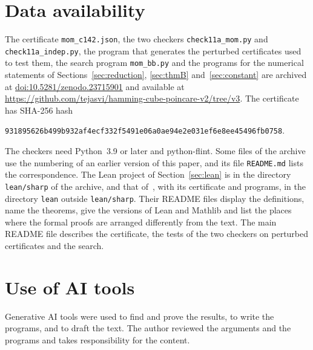 \documentclass[11pt]{amsart}
\theoremstyle{remark}
\numberwithin{equation}{section}
\newcommand{\CertSha}{931895626b499b932af4ecf332f5491e06a0ae94e2e031ef6e8ee45496fb0758}
\newcommand{\SUPPDOI}{10.5281/zenodo.23715901}
\newcommand{\REPOURL}{https://github.com/tejasvi/hamming-cube-poincare-v2/tree/v3}
\begin{document}
\section*{Data availability}
\begingroup\sloppy
The certificate \texttt{mom\_c142.json}, the two checkers \texttt{check11a\_mom.py} and \texttt{check11a\_indep.py}, the program that generates the perturbed certificates used to test them, the search program \texttt{mom\_bb.py} and the programs for the numerical statements of Sections~\ref{sec:reduction}, \ref{sec:thmB} and~\ref{sec:constant} are archived at \href{https://doi.org/\SUPPDOI}{doi:\SUPPDOI} and available at\\ \url{\REPOURL}. The certificate has SHA-256 hash
\begin{center}\scriptsize\texttt{\CertSha}.\end{center}
The checkers need Python~3.9 or later and python-flint. Some files of the archive use the numbering of an earlier version of this paper, and its file \texttt{README.md} lists the correspondence. The Lean project of Section~\ref{sec:lean} is in the directory \texttt{lean/sharp} of the archive, and that of~\cite{Tom26}, with its certificate and programs, in the directory \texttt{lean} outside \texttt{lean/sharp}. Their README files display the definitions, name the theorems, give the versions of Lean and Mathlib and list the places where the formal proofs are arranged differently from the text. The main README file describes the certificate, the tests of the two checkers on perturbed certificates and the search.\par\endgroup

\section*{Use of AI tools}
Generative AI tools were used to find and prove the results, to write the programs, and to draft the text. The author reviewed the arguments and the programs and takes responsibility for the content.
\end{document}
